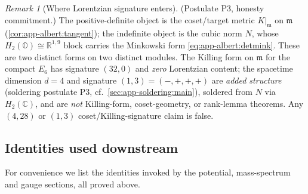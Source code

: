 \documentclass[11pt]{article}
\theoremstyle{plain}
\theoremstyle{definition}
\theoremstyle{remark}
\newtheorem{remark}[theorem]{Remark}
\begin{document}
\begin{remark}[Where Lorentzian signature enters]\label{rmk:app-albert:signature}
\textup{(Postulate P3, honesty commitment.)}
The positive-definite object is the coset/target metric $K|_{\mathfrak m}$ on
$\mathfrak m$ (\autoref{cor:app-albert:tangent}); the indefinite object is the
cubic norm $N$, whose $H_2(\mathbb O)\cong\mathbb R^{1,9}$ block carries the
Minkowski form \eqref{eq:app-albert:detmink}. These are two distinct forms on two
distinct modules. The Killing form on $\mathfrak m$ for the compact $E_6$ has
signature $(32,0)$ and \emph{zero} Lorentzian content; the spacetime dimension
$d=4$ and signature $(1,3)=(-,+,+,+)$ are \emph{added structure} (soldering
postulate P3, cf.\ \autoref{sec:app-soldering:main}), soldered from $N$ via
$H_2(\mathbb C)$, and are \emph{not} Killing-form, coset-geometry, or rank-lemma
theorems. Any $(4,28)$ or $(1,3)$ coset/Killing-signature claim is false.
\end{remark}

\subsection{Identities used downstream}
\label{sec:app-albert:identities}

For convenience we list the identities invoked by the potential, mass-spectrum and
gauge sections, all proved above.
\end{document}
